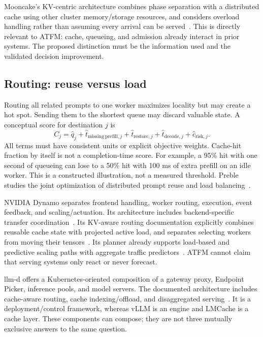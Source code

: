 Mooncake's KV-centric architecture combines phase separation with a distributed
cache using other cluster memory/storage resources, and considers overload
handling rather than assuming every arrival can be served~\cite{mooncake}.
This is directly relevant to ATFM: cache, queueing, and admission already interact
in prior systems. The proposed distinction must be the information used and the
validated decision improvement.

\subsection{Routing: reuse versus load}
Routing all related prompts to one worker maximizes locality but may create a
hot spot. Sending them to the shortest queue may discard valuable state. A
conceptual score for destination $j$ is
\begin{equation}
 C_j = \widehat q_j + \widehat t_{\mathrm{missing\ prefill},j}
       +\widehat t_{\mathrm{restore},j}+\widehat t_{\mathrm{decode},j}
       +\widehat c_{\mathrm{risk},j}.
 \label{eq:routing}
\end{equation}
All terms must have consistent units or explicit objective weights. Cache-hit
fraction by itself is not a completion-time score. For example, a 95\% hit with
one second of queueing can lose to a 50\% hit with 100 ms of extra prefill on an
idle worker. This is a constructed illustration, not a measured threshold.
Preble studies the joint optimization of distributed prompt reuse and load
balancing~\cite{preble}.

NVIDIA Dynamo separates frontend handling, worker routing, execution, event
feedback, and scaling/actuation. Its architecture includes backend-specific
transfer coordination~\cite{dynamo}. Its KV-aware routing documentation
explicitly combines reusable cache state with projected active load, and
separates selecting workers from moving their tensors~\cite{drouter}. Its
planner already supports load-based and predictive scaling paths with
aggregate traffic predictors~\cite{dplanner}. ATFM cannot claim that serving
systems only react or never forecast.

llm-d offers a Kubernetes-oriented composition of a gateway proxy, Endpoint
Picker, inference pools, and model servers. The documented architecture includes
cache-aware routing, cache indexing/offload, and disaggregated
serving~\cite{llmd}. It is a deployment/control framework, whereas vLLM is an
engine and LMCache is a cache layer. These components can compose; they are not
three mutually exclusive answers to the same question.

